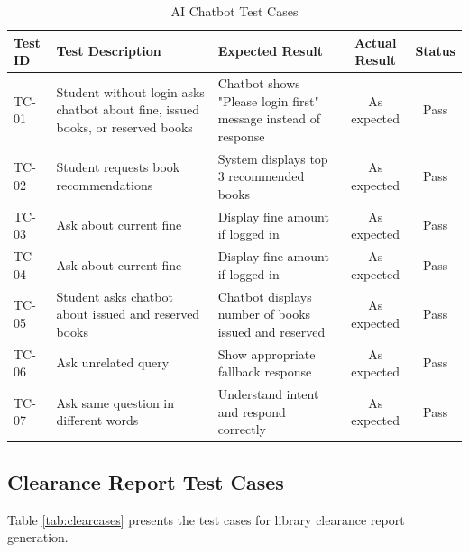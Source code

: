 \documentclass[12pt,a4paper]{report}
\begin{document}
\begin{table}[H]
\centering
\begin{tabularx}{\textwidth}{|l|X|X|c|c|}
\hline
\textbf{Test ID} & \textbf{Test Description} & \textbf{Expected Result} & \textbf{Actual Result} & \textbf{Status} \\
\hline
TC-01 & Student without login asks chatbot about fine, issued books, or reserved books & Chatbot shows "Please login first" message instead of response & As expected & Pass \\
\hline
TC-02 & Student requests book recommendations & System displays top 3 recommended books & As expected & Pass \\
\hline
TC-03 & Ask about current fine & Display fine amount if logged in & As expected & Pass \\
\hline
TC-04 & Ask about current fine & Display fine amount if logged in & As expected & Pass \\
\hline
TC-05 & Student asks chatbot about issued and reserved books & Chatbot displays number of books issued and reserved & As expected & Pass \\
\hline
TC-06 & Ask unrelated query & Show appropriate fallback response & As expected & Pass \\
\hline
TC-07 & Ask same question in different words & Understand intent and respond correctly & As expected & Pass \\
\hline
\end{tabularx}
\caption{AI Chatbot Test Cases}
\label{tab:chatcases}
\end{table}


\newpage

\subsection{Clearance Report Test Cases}

Table \ref{tab:clearcases} presents the test cases for library clearance report generation.

\vspace{0.5cm}
\end{document}
